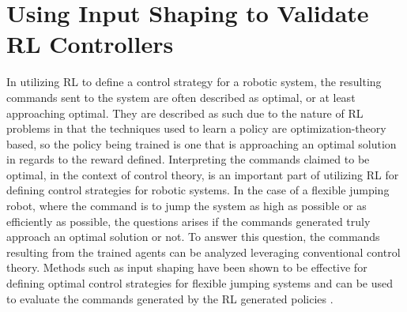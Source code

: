 \chapter{Using Input Shaping to Validate RL Controllers}
\label{chapter3}
%
In utilizing RL to define a control strategy for a robotic system, the resulting commands sent to the system are often described as optimal, or at least approaching optimal. They are described as such due to the nature of RL problems in that the techniques used to learn a policy are optimization-theory based, so the policy being trained is one that is approaching an optimal solution in regards to the reward defined. Interpreting the commands claimed to be optimal, in the context of control theory, is an important part of utilizing RL for defining control strategies for robotic systems. In the case of a flexible jumping robot, where the command is to jump the system as high as possible or as efficiently as possible, the questions arises if the commands generated truly approach an optimal solution or not. To answer this question, the commands resulting from the trained agents can be analyzed leveraging conventional control theory. Methods such as input shaping have been shown to be effective for defining optimal control strategies for flexible jumping systems and can be used to evaluate the commands generated by the RL generated policies \cite{Vaughan2013}.

